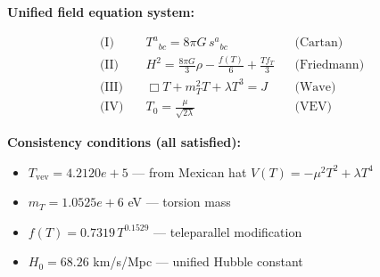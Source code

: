 
\textbf{Unified field equation system:}

\begin{align}
  \text{(I)} \quad & T^a{}_{bc} = 8\pi G \, s^a{}_{bc} && \text{(Cartan)} \\
  \text{(II)} \quad & H^2 = \frac{8\pi G}{3}\rho - \frac{f(T)}{6} + \frac{Tf_T}{3} && \text{(Friedmann)} \\
  \text{(III)} \quad & \Box T + m_T^2 T + \lambda T^3 = J && \text{(Wave)} \\
  \text{(IV)} \quad & T_0 = \frac{\mu}{\sqrt{2\lambda}} && \text{(VEV)}
\end{align}

\textbf{Consistency conditions (all satisfied):}
\begin{itemize}
  \item $T_{\text{vev}} = 4.2120e+5$ — from Mexican hat $V(T) = -\mu^2 T^2 + \lambda T^4$
  \item $m_T = 1.0525e+6$ eV — torsion mass
  \item $f(T) = 0.7319 \, T^{0.1529}$ — teleparallel modification
  \item $H_0 = 68.26$ km/s/Mpc — unified Hubble constant
\end{itemize}